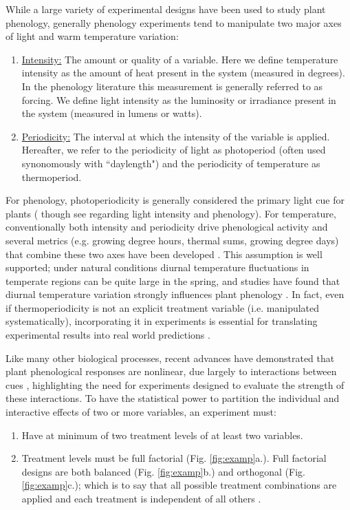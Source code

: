 \documentclass[11pt]{article}
\begin{document}
While a large variety of experimental designs have been used to study plant phenology, generally phenology experiments tend to manipulate two major axes of light and warm temperature variation:
\begin{enumerate}
\item \underline{Intensity:} The amount or quality of a variable. Here we define temperature intensity as the amount of heat present in the system (measured in degrees). In the phenology literature this measurement is generally referred to as forcing. We define light intensity as the luminosity or irradiance present in the system (measured in lumens or watts). 
\item \underline{Periodicity:} The interval at which the intensity of the variable is applied. Hereafter, we refer to the periodicity of light as photoperiod (often used synonomously with ``daylength") and the periodicity of temperature as thermoperiod. 
\end{enumerate}
For phenology, photoperiodicity is generally considered the primary light cue for plants (\citep{WAY:2015aa} though see \citep{Brelsford2018,Cober1996} regarding light intensity and phenology). For temperature, conventionally both intensity and periodicity drive phenological activity and several metrics (e.g. growing degree hours, thermal sums, growing degree days)  that combine these two axes have been developed \citep{Gu:2016wa}. This assumption is well supported; under natural conditions diurnal temperature fluctuations in temperate regions can be quite large in the spring, and studies have found that diurnal temperature variation strongly influences plant phenology \citep{Burghardt:2016uy}. In fact, even if thermoperiodicity is not an explicit treatment variable (i.e. manipulated systematically), incorporating it in experiments is essential for translating experimental results into real world predictions \citep{plants9101312}.

Like many other biological processes, recent advances have demonstrated that plant phenological responses are nonlinear, due largely to interactions between cues \citep{limitingcues,fu2015}, highlighting the need for experiments designed to evaluate the strength of these interactions. To have the statistical power to partition the individual and interactive effects of two or more variables, an experiment must:
\begin{enumerate}
\item Have at minimum of two treatment levels of at least two variables.
\item Treatment levels must be full factorial (Fig. \ref{fig:examp}a.). Full factorial designs are both balanced (Fig. \ref{fig:examp}b.)  and orthogonal (Fig. \ref{fig:examp}c.); which is to say that all possible treatment combinations are applied and each treatment is independent of all others \citep{cheng2016}.
\end{enumerate}
\end{document}
